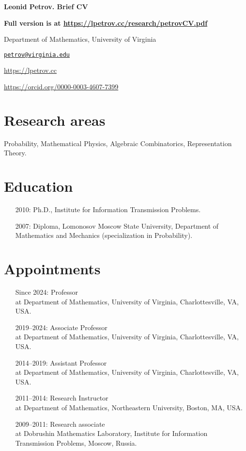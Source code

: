 \documentclass[letterpaper,11pt]{article}
\def\name{Leonid Petrov}
\begin{document}
\centerline{\huge \bf \name . Brief CV}
\bigskip

\textbf{Full version is at \url{https://lpetrov.cc/research/petrovCV.pdf}}

\noindent\hrulefill

\vspace{0.25in}

Department of Mathematics, University of Virginia

\href{mailto:petrov@virginia.edu}{\tt petrov@virginia.edu}

\url{https://lpetrov.cc}

\url{https://orcid.org/0000-0003-4607-7399}

\section*{Research areas}

Probability, Mathematical Physics, Algebraic Combinatorics, Representation
Theory.

\section*{Education}

\begin{itemize}
	\item [2010:]
		Ph.D., 
		Institute for Information Transmission Problems.

	\item [2007:]
		Diploma,
		Lomonosov Moscow State University,
		Department of Mathematics and Mechanics (specialization in Probability). 
\end{itemize}

\section*{Appointments}

\begin{itemize}
	\item
	[Since 2024:]
	Professor\\ at Department of Mathematics, University
	of Virginia, Charlottesville, VA, USA.
\item
	[2019--2024:]
	Associate Professor\\ at Department of Mathematics, University
	of Virginia, Charlottesville, VA, USA.
	\item
	      [2014--2019:]
	      Assistant Professor\\ at Department of Mathematics, University
	      of Virginia, Charlottesville, VA, USA.
	\item
	      [2011--2014:]
	      Research Instructor\\ at Department of Mathematics, Northeastern
	      University, Boston, MA, USA.
	\item
	      [2009--2011:]
	      Research associate\\ at Dobrushin Mathematics Laboratory,
	      Institute for Information Transmission Problems, Moscow, Russia.
\end{itemize}
\end{document}
